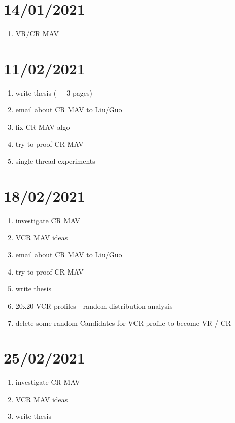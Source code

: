\section{14/01/2021}
\begin{enumerate}
    \item VR/CR MAV \cite{mav}
\end{enumerate}

\section{11/02/2021}
\begin{enumerate}
    \item write thesis (+- 3 pages)
    \item email about CR MAV to Liu/Guo
    \item fix CR MAV algo
    \item try to proof CR MAV 
    \item single thread experiments
\end{enumerate}

\section{18/02/2021}
\begin{enumerate}
    \item investigate CR MAV
    \item VCR MAV ideas
    \item email about CR MAV to Liu/Guo
    \item try to proof CR MAV 
    \item write thesis
    \item 20x20 VCR profiles - random distribution analysis
    \item delete some random Candidates for VCR profile to become VR / CR
\end{enumerate}

\section{25/02/2021}
\begin{enumerate}
    \item investigate CR MAV
    \item VCR MAV ideas
    \item write thesis
\end{enumerate}

